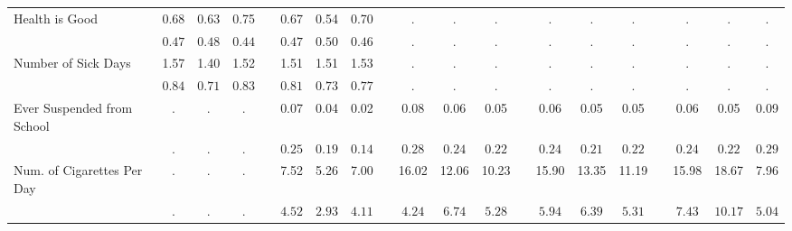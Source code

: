 \begin{center}
{\begin{longtable}{L{5cm} c c c p{.5cm} c c c p{.5cm} c c c p{.5cm} c c c p{.5cm} c c c}
 \quad Health is Good & 0.68 &      0.63 &      0.75 & &      0.67 &      0.54 &      0.70 & &         . &         . &         . & &         . &         . &         . & &         . &         . &         . \\*
 \quad & $\mathit{     0.47}$ & $\mathit{     0.48}$ & $\mathit{     0.44}$ & & $\mathit{     0.47}$ & $\mathit{     0.50}$ & $\mathit{     0.46}$ & & $\mathit{        .}$ & $\mathit{        .}$ & $\mathit{        .}$ & & $\mathit{        .}$ & $\mathit{        .}$ & $\mathit{        .}$ & & $\mathit{        .}$ & $\mathit{        .}$ & $\mathit{        .}$ \\[.2em]
 \quad Number of Sick Days & 1.57 &      1.40 &      1.52 & &      1.51 &      1.51 &      1.53 & &         . &         . &         . & &         . &         . &         . & &         . &         . &         . \\*
 \quad & $\mathit{     0.84}$ & $\mathit{     0.71}$ & $\mathit{     0.83}$ & & $\mathit{     0.81}$ & $\mathit{     0.73}$ & $\mathit{     0.77}$ & & $\mathit{        .}$ & $\mathit{        .}$ & $\mathit{        .}$ & & $\mathit{        .}$ & $\mathit{        .}$ & $\mathit{        .}$ & & $\mathit{        .}$ & $\mathit{        .}$ & $\mathit{        .}$ \\[.2em]
 \quad Ever Suspended from School & . &         . &         . & &      0.07 &      0.04 &      0.02 & &      0.08 &      0.06 &      0.05 & &      0.06 &      0.05 &      0.05 & &      0.06 &      0.05 &      0.09 \\*
 \quad & $\mathit{        .}$ & $\mathit{        .}$ & $\mathit{        .}$ & & $\mathit{     0.25}$ & $\mathit{     0.19}$ & $\mathit{     0.14}$ & & $\mathit{     0.28}$ & $\mathit{     0.24}$ & $\mathit{     0.22}$ & & $\mathit{     0.24}$ & $\mathit{     0.21}$ & $\mathit{     0.22}$ & & $\mathit{     0.24}$ & $\mathit{     0.22}$ & $\mathit{     0.29}$ \\[.2em]
 \quad Num. of Cigarettes Per Day & . &         . &         . & &      7.52 &      5.26 &      7.00 & &     16.02 &     12.06 &     10.23 & &     15.90 &     13.35 &     11.19 & &     15.98 &     18.67 &      7.96 \\*
 \quad & $\mathit{        .}$ & $\mathit{        .}$ & $\mathit{        .}$ & & $\mathit{     4.52}$ & $\mathit{     2.93}$ & $\mathit{     4.11}$ & & $\mathit{     4.24}$ & $\mathit{     6.74}$ & $\mathit{     5.28}$ & & $\mathit{     5.94}$ & $\mathit{     6.39}$ & $\mathit{     5.31}$ & & $\mathit{     7.43}$ & $\mathit{    10.17}$ & $\mathit{     5.04}$ \\[.2em]

\end{longtable}}
\end{center}
